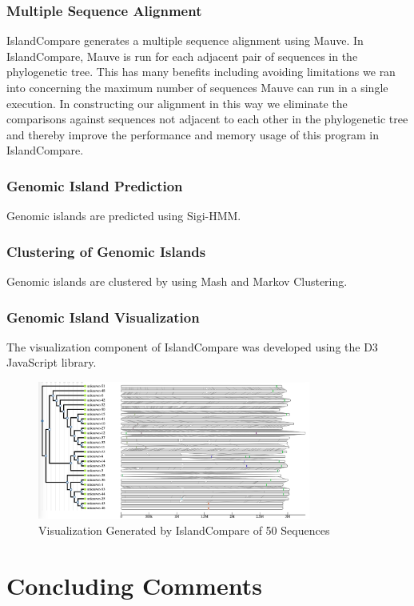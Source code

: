 	\subsubsection{Multiple Sequence Alignment}
		IslandCompare generates a multiple sequence alignment using Mauve.\cite{10_mauve} In IslandCompare, Mauve is run for each adjacent pair of sequences in the phylogenetic tree. This has many benefits including avoiding limitations we ran into concerning the maximum number of sequences Mauve can run in a single execution. In constructing our alignment in this way we eliminate the comparisons against sequences not adjacent to each other in the phylogenetic tree and thereby improve the performance and memory usage of this program in IslandCompare.
	
	\subsubsection{Genomic Island Prediction}
		Genomic islands are predicted using Sigi-HMM.\cite{11_sigihmm}
		
	\subsubsection{Clustering of Genomic Islands}
		Genomic islands are clustered by using Mash and Markov Clustering.\cite{12_mash, 13_mcl}
	
	\subsubsection{Genomic Island Visualization}	
		The visualization component of IslandCompare was developed using the D3 JavaScript library.\cite{6_d3}
		
		\begin{figure}[h]
			\centering
			\includegraphics[width=0.8\textwidth]{IslandCompare}
			\caption{\label{fig:islandcompare} Visualization Generated by IslandCompare of 50 Sequences}
		\end{figure}

	\section{Concluding Comments}

	\clearpage
	
	

